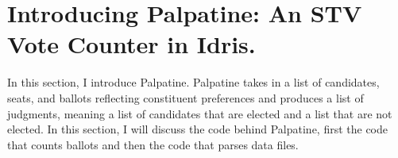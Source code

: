 \chapter{Introducing Palpatine: An STV Vote Counter in Idris.}

In this section, I introduce Palpatine. Palpatine takes in a list of candidates,
seats, and ballots reflecting constituent preferences and produces a list of
judgments, meaning a list of candidates that are elected and a list that are not
elected. In this section, I will discuss the code behind Palpatine, first the
code that counts ballots and then the code that parses data files. 


\clearpage

\clearpage

\clearpage
